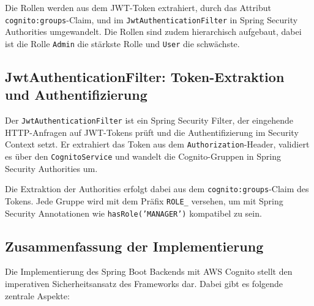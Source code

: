Die Rollen werden aus dem \ac{JWT}-Token extrahiert, durch das Attribut \texttt{cognito:groups}-Claim, und im \texttt{JwtAuthenticationFilter} in Spring Security Authorities umgewandelt. Die Rollen sind zudem hierarchisch aufgebaut, dabei ist die Rolle \texttt{Admin} die stärkste Rolle und \texttt{User} die schwächste.

\subsection{JwtAuthenticationFilter: Token-Extraktion und Authentifizierung}

Der \texttt{JwtAuthenticationFilter} ist ein Spring Security Filter, der eingehende HTTP-Anfragen auf \ac{JWT}-Tokens prüft und die Authentifizierung im Security Context setzt. Er extrahiert das Token aus dem \texttt{Authorization}-Header, validiert es über den \texttt{CognitoService} und wandelt die Cognito-Gruppen in Spring Security Authorities um.

Die Extraktion der Authorities erfolgt dabei aus dem \texttt{cognito:groups}-Claim des Tokens. Jede Gruppe wird mit dem Präfix \texttt{ROLE\_} versehen, um mit Spring Security Annotationen wie \texttt{hasRole('MANAGER')} kompatibel zu sein.

\subsection{Zusammenfassung der Implementierung}

Die Implementierung des Spring Boot Backends mit \ac{AWS} Cognito stellt den imperativen Sicherheitsansatz des Frameworks dar. Dabei gibt es folgende zentrale Aspekte:

